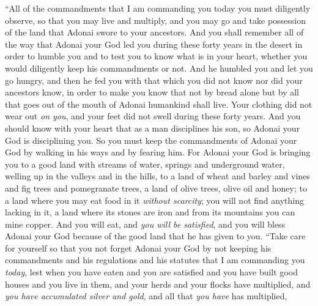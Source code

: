 \begin{biblechapter} %
\verse “All of the commandments that I am commanding you today you must diligently observe, so that you may live and multiply, and you may go and take possession of the land that Adonai swore to your ancestors.
\verse And you shall remember all of the way that Adonai your God led you during these forty years in the desert in order to humble you and to test you to know what is in your heart, whether you would diligently keep his commandments or not.
\verse And he humbled you and let you go hungry, and then he fed you with that which you did not know nor did your ancestors know, in order to make you know that not by bread alone but by all that goes out of the mouth of Adonai humankind shall live.
\verse Your clothing did not wear out \textit{on you}, and your feet did not swell during these forty years.
\verse And you should know with your heart that as a man disciplines his son, so Adonai your God is disciplining you.
\verse So you must keep the commandments of Adonai your God by walking in his ways and by fearing him.
\verse For Adonai your God is bringing you to a good land with streams of water, springs and underground water, welling up in the valleys and in the hills,
\verse to a land of wheat and barley and vines and fig trees and pomegranate trees, a land of olive trees, olive oil and honey;
\verse to a land where you may eat food in it \textit{without scarcity}; you will not find anything lacking in it, a land where its stones are iron and from its mountains you can mine copper.
\verse And you will eat, and \textit{you will be satisfied}, and you will bless Adonai your God because of the good land that he has given to you.
\verse “Take care for yourself so that you not forget Adonai your God by not keeping his commandments and his regulations and his statutes that I am commanding you \textit{today},
\verse lest when you have eaten and you are satisfied and you have built good houses and you live in them,
\verse and your herds and your flocks have multiplied, and \textit{you have accumulated silver and gold}, and all that \textit{you have} has multiplied,

\end{biblechapter}

